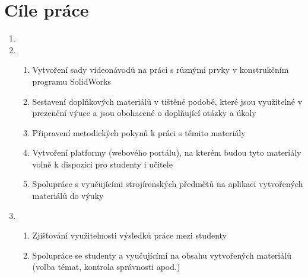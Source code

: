 \chapter{Cíle práce}

\begin{enumerate}[topsep=0pt]
    \setlength\itemsep{0em}
    \item {}
    
    \item {}
    \begin{enumerate}[topsep=0pt]
        \setlength\itemsep{0em}
        \item Vytvoření sady videonávodů na práci s různými prvky v konstrukčním programu SolidWorks
        \item Sestavení doplňkových materiálů v tištěné podobě, které jsou využitelné v prezenční výuce a jsou obohacené o doplňující otázky a úkoly
        \item Připravení metodických pokynů k práci s těmito materiály
        \item Vytvoření platformy (webového portálu), na kterém budou tyto materiály volně k dispozici pro studenty i učitele
        \item Spolupráce s vyučujícími strojírenských předmětů na aplikaci vytvořených materiálů do výuky
    \end{enumerate}

    \item {}
    \begin{enumerate}[topsep=0pt]
        \setlength\itemsep{0em}
        \item Zjišťování využitelnosti výsledků práce mezi studenty 
        \item Spolupráce se studenty a vyučujícími na obsahu vytvořených materiálů (volba témat, kontrola správnosti apod.) 
    \end{enumerate}
\end{enumerate}
